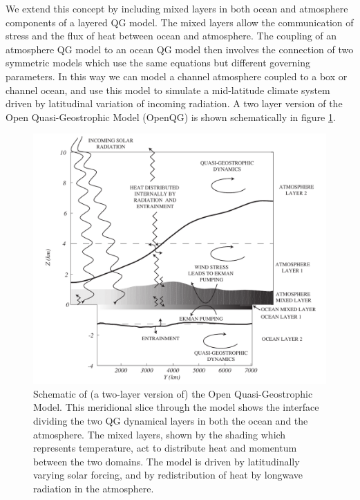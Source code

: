 \documentclass[11pt, a4paper,twoside]{article}
\numberwithin{equation}{section}
\begin{document}
We extend this concept by including mixed layers in both ocean and atmosphere components of a layered QG model.
The mixed layers allow the communication of stress and the flux of heat between ocean and atmosphere.
The coupling of an atmosphere QG model to an ocean QG model then involves the connection of two symmetric models which use the same equations but different governing parameters.
In this way we can model a channel atmosphere coupled to a box or channel ocean, and use this model to simulate a mid-latitude climate system driven by latitudinal variation of incoming radiation.
A two layer version of the Open Quasi-Geostrophic Model (OpenQG) is shown schematically in figure \ref{fig:sketch}.

\begin{figure}[!t]
\includegraphics[width=\hsize]{sketch}
\caption{\small Schematic of (a two-layer version of) the Open Quasi-Geostrophic Model. This
meridional slice through the model shows the interface dividing the two QG
dynamical layers in both the ocean and the atmosphere. The mixed layers,
shown by the shading which represents temperature, act to distribute heat
and momentum between the two domains. The model is driven by latitudinally
varying solar forcing, and by redistribution of heat by longwave radiation
in the atmosphere.\label{fig:sketch}}
\end{figure}
\end{document}
